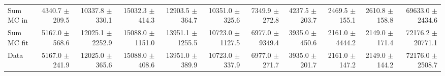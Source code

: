 \begin{table}[htbp]
{\begin{tabular}{lrrrrrrrrrr}
\hline
Sum MC in & 4340.7 $\pm$ 209.5 & 10337.8 $\pm$ 330.1 & 15032.3 $\pm$ 414.3 & 12903.5 $\pm$ 364.7 & 10351.0 $\pm$ 325.6 & 7349.9 $\pm$ 272.8 & 4237.5 $\pm$ 203.7 & 2469.5 $\pm$ 155.1 & 2610.8 $\pm$ 158.8& 69633.0 $\pm$ 2434.6 \\
Sum MC fit & 5167.0 $\pm$ 568.6 & 12025.1 $\pm$ 2252.9 & 15088.0 $\pm$ 1151.0 & 13951.1 $\pm$ 1255.5 & 10723.0 $\pm$ 1127.5 & 6977.0 $\pm$ 9349.4 & 3935.0 $\pm$ 450.6 & 2161.0 $\pm$ 4444.2 & 2149.0 $\pm$ 171.4 & 72176.2 $\pm$ 20771.1 \\
\hline
Data & 5167.0 $\pm$ 241.9 & 12025.0 $\pm$ 365.6 & 15088.0 $\pm$ 408.6 & 13951.0 $\pm$ 389.9 & 10723.0 $\pm$ 337.9 & 6977.0 $\pm$ 271.7 & 3935.0 $\pm$ 201.7 & 2161.0 $\pm$ 147.2 & 2149.0 $\pm$ 144.2 & 72176.0 $\pm$ 2508.7 \\
\hline
\end{tabular}
}
\end{table}
